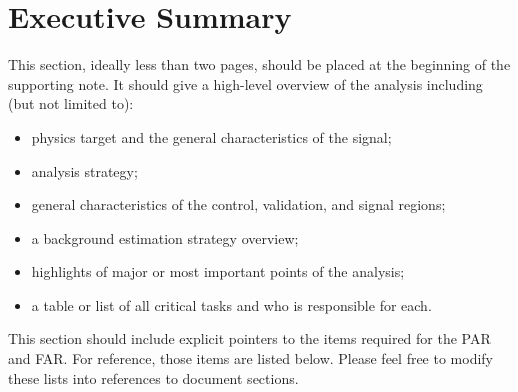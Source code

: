 \section{Executive Summary}

This section, ideally less than two pages, should be placed at the beginning of the supporting note.
It should give a high-level overview of the analysis including (but not limited to):
\begin{itemize}
\item physics target and the general characteristics of the signal;
\item analysis strategy;
\item general characteristics of the control, validation, and signal regions;
\item a background estimation strategy overview;
\item highlights of major or most important points of the analysis;
\item a table or list of all critical tasks and who is responsible for each.
\end{itemize}

This section should include explicit pointers to the items required for the PAR and FAR.  For reference, those items are listed below. Please feel free to modify these lists into references to document sections.

